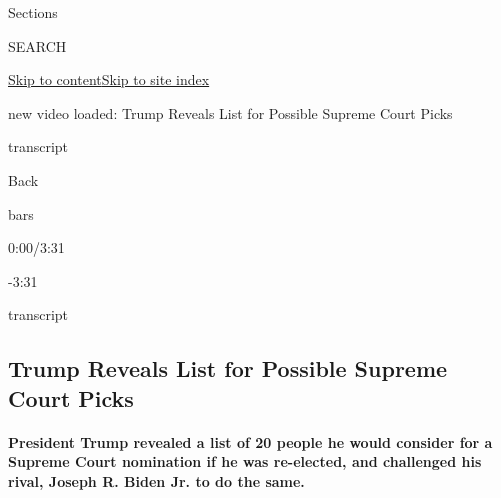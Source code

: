 Sections

SEARCH

\protect\hyperlink{site-content}{Skip to
content}\protect\hyperlink{site-index}{Skip to site index}

new video loaded: Trump Reveals List for Possible Supreme Court Picks

transcript

Back

bars

0:00/3:31

-3:31

transcript

\hypertarget{trump-reveals-list-for-possible-supreme-court-picks}{%
\subsection{Trump Reveals List for Possible Supreme Court
Picks}\label{trump-reveals-list-for-possible-supreme-court-picks}}

\hypertarget{president-trump-revealed-a-list-of-20-people-he-would-consider-for-a-supreme-court-nomination-if-he-was-re-elected-and-challenged-his-rival-joseph-r-biden-jr-to-do-the-same}{%
\paragraph{President Trump revealed a list of 20 people he would
consider for a Supreme Court nomination if he was re-elected, and
challenged his rival, Joseph R. Biden Jr. to do the
same.}\label{president-trump-revealed-a-list-of-20-people-he-would-consider-for-a-supreme-court-nomination-if-he-was-re-elected-and-challenged-his-rival-joseph-r-biden-jr-to-do-the-same}}

